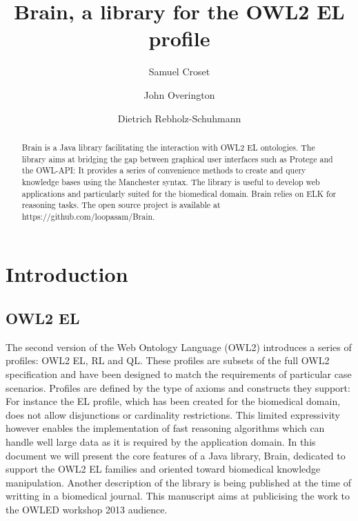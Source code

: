 \documentclass{llncs}
\begin{document}
%
\frontmatter          %
%
\pagestyle{headings}  %

\mainmatter              %
%
\title{Brain, a library for the OWL2 EL profile}
%
\author{Samuel Croset \and John Overington \and Dietrich Rebholz-Schuhmann}

\maketitle              %

\begin{abstract}
Brain is a Java library facilitating the interaction with OWL2 EL ontologies. 
The library aims at bridging the gap between graphical user interfaces such as Protege and the OWL-API: It provides 
a series of convenience methods to create and query knowledge bases using the Manchester syntax. 
The library is useful to develop web applications and particularly suited for the biomedical domain. 
Brain relies on ELK for reasoning tasks. The open source project is available at https://github.com/loopasam/Brain.

\end{abstract}

\section{Introduction}
\subsection{OWL2 EL}
The second version of the Web Ontology Language (OWL2) introduces a series of profiles: OWL2 EL, RL and QL.
These profiles are subsets of the full OWL2 specification and have been designed to match the requirements of particular case scenarios.
Profiles are defined by the type of axioms and constructs they support: For instance the EL profile, which has been 
created for the biomedical domain, does not allow 
disjunctions or cardinality restrictions. This limited expressivity however enables the implementation of fast reasoning algorithms which can
handle well large data as it is required by the application domain. In this document we will present the core features of a 
Java library, Brain, dedicated to support the OWL2 EL families and oriented toward biomedical knowledge manipulation. Another description
of the library is being published at the time of writting in a biomedical journal. This manuscript aims at publicising the work to the
OWLED workshop 2013 audience.
\end{document}
